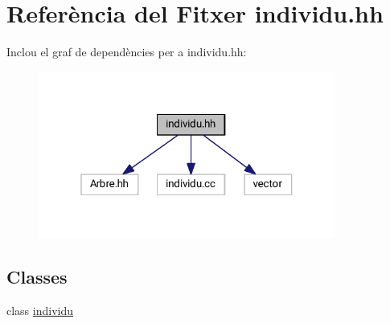 \hypertarget{individu_8hh}{}\section{Referència del Fitxer individu.\+hh}
\label{individu_8hh}
Inclou el graf de dependències per a individu.\+hh\+:
\nopagebreak
\begin{figure}[H]
\begin{center}
\leavevmode
\includegraphics[width=277pt]{individu_8hh__incl}
\end{center}
\end{figure}
\subsection*{Classes}
\begin{DoxyCompactItemize}
\item 
class \hyperlink{classindividu}{individu}
\end{DoxyCompactItemize}
